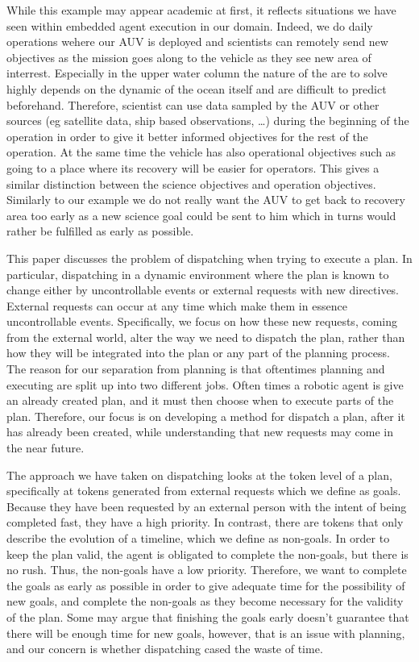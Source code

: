 While this example may appear academic at first, it reflects situations
we have seen within embedded agent execution in our domain. Indeed, we
do daily operations wehere our AUV is deployed and scientists can
remotely send new objectives as the mission goes along to the vehicle
as they see new area of interrest. Especially in the upper water
column the nature of the are to solve highly depends on the dynamic of
the ocean itself and are difficult to predict beforehand. Therefore,
scientist can use data sampled by the AUV or other sources (eg
satellite data, ship based observations, \dots{}) during the beginning of
the operation in order to give it better informed objectives for the
rest of the operation. At the same time the vehicle has
also operational objectives such as going to a place where its
recovery will be easier for operators. This gives a similar
distinction between the science objectives and operation
objectives. Similarly to our example we do not really want the
AUV to get back to recovery area too early as a new science goal could
be sent to him which in turns would rather be fulfilled as early as
possible.

This paper discusses the problem of dispatching when trying to execute
a plan. In particular, dispatching in a dynamic environment where the
plan is known to change either by uncontrollable events or external
requests with new directives. External requests  can occur
at any time which make them in essence uncontrollable events.
Specifically, we focus on how these new requests, coming from the
external world, alter the way we need to dispatch the plan, rather than
how they will be integrated into the plan or any part of the planning
process. The reason for our separation from planning is that
oftentimes planning and executing are split up into two different
jobs. Often times a robotic agent is give an already created plan, and it
must then choose when to execute parts of the plan. Therefore, our focus is on
developing a method for dispatch a plan, after it has already been created, while
understanding that new requests may come in the near future.

The approach we have taken on dispatching looks at the token level of a plan,
specifically at tokens generated from external requests which we define as goals.
Because they have been requested by an external person with the intent of being 
completed fast, they have a high priority. In contrast, there are tokens that only describe the
evolution of a timeline, which we define as non-goals. In order to keep the plan 
valid, the agent is obligated to complete the non-goals, but there is no rush. Thus, the
non-goals have a low priority. Therefore, we want to complete the goals
as early as possible in order to give adequate time for the possibility of new
goals, and complete the non-goals as they become necessary for the validity of the plan. 
Some may argue that finishing the goals early doesn't guarantee that
there will be enough time for new goals, however, that is an issue with planning, 
and our concern is whether dispatching cased the waste of time.


